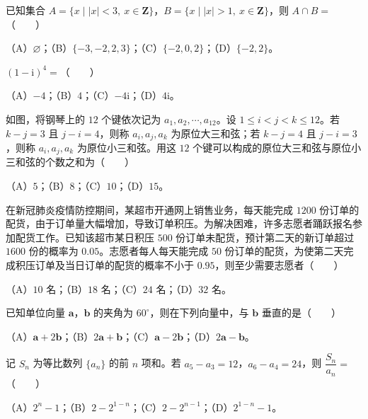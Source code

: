\begin{question}
已知集合 $A=\{x\mid |x|<3,\ x\in\mathbf Z\}$，$B=\{x\mid |x|>1,\ x\in\mathbf Z\}$，则 $A\cap B=$\mbox{（　　）}

（A）$\varnothing$；（B）$\{-3,-2,2,3\}$；（C）$\{-2,0,2\}$；（D）$\{-2,2\}$。

\end{question}
\begin{question}
$(1-\mathrm i)^4=$\mbox{（　　）}

（A）$-4$；（B）$4$；（C）$-4\mathrm i$；（D）$4\mathrm i$。

\Needspace{0.4\textheight}
\end{question}
\begin{question}
如图，将钢琴上的 $12$ 个键依次记为 $a_1,a_2,\cdots,a_{12}$。设 $1\leqslant i<j<k\leqslant12$。若 $k-j=3$ 且 $j-i=4$，则称 $a_i,a_j,a_k$ 为原位大三和弦；若 $k-j=4$ 且 $j-i=3$，则称 $a_i,a_j,a_k$ 为原位小三和弦。用这 $12$ 个键可以构成的原位大三和弦与原位小三和弦的个数之和为\mbox{（　　）}

（A）$5$；（B）$8$；（C）$10$；（D）$15$。
\nopagebreak[4]
\begin{center}\end{center}
\nopagebreak[4]
\end{question}
\begin{question}
在新冠肺炎疫情防控期间，某超市开通网上销售业务，每天能完成 $1200$ 份订单的配货，由于订单量大幅增加，导致订单积压。为解决困难，许多志愿者踊跃报名参加配货工作。已知该超市某日积压 $500$ 份订单未配货，预计第二天的新订单超过 $1600$ 份的概率为 $0.05$。志愿者每人每天能完成 $50$ 份订单的配货，为使第二天完成积压订单及当日订单的配货的概率不小于 $0.95$，则至少需要志愿者\mbox{（　　）}

（A）$10$ 名；（B）$18$ 名；（C）$24$ 名；（D）$32$ 名。

\end{question}
\begin{question}
已知单位向量 $\boldsymbol a$，$\boldsymbol b$ 的夹角为 $60^\circ$，则在下列向量中，与 $\boldsymbol b$ 垂直的是\mbox{（　　）}

（A）$\boldsymbol a+2\boldsymbol b$；（B）$2\boldsymbol a+\boldsymbol b$；（C）$\boldsymbol a-2\boldsymbol b$；（D）$2\boldsymbol a-\boldsymbol b$。

\end{question}
\begin{question}
记 $S_n$ 为等比数列 $\{a_n\}$ 的前 $n$ 项和。若 $a_5-a_3=12$，$a_6-a_4=24$，则 $\dfrac{S_n}{a_n}=$\mbox{（　　）}

（A）$2^n-1$；（B）$2-2^{1-n}$；（C）$2-2^{n-1}$；（D）$2^{1-n}-1$。

\Needspace{0.4\textheight}
\end{question}
